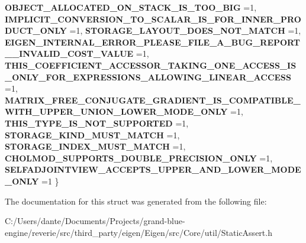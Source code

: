 \begin{DoxyCompactItemize}
\newline
{\bfseries O\+B\+J\+E\+C\+T\+\_\+\+A\+L\+L\+O\+C\+A\+T\+E\+D\+\_\+\+O\+N\+\_\+\+S\+T\+A\+C\+K\+\_\+\+I\+S\+\_\+\+T\+O\+O\+\_\+\+B\+IG} =1, 
{\bfseries I\+M\+P\+L\+I\+C\+I\+T\+\_\+\+C\+O\+N\+V\+E\+R\+S\+I\+O\+N\+\_\+\+T\+O\+\_\+\+S\+C\+A\+L\+A\+R\+\_\+\+I\+S\+\_\+\+F\+O\+R\+\_\+\+I\+N\+N\+E\+R\+\_\+\+P\+R\+O\+D\+U\+C\+T\+\_\+\+O\+N\+LY} =1, 
{\bfseries S\+T\+O\+R\+A\+G\+E\+\_\+\+L\+A\+Y\+O\+U\+T\+\_\+\+D\+O\+E\+S\+\_\+\+N\+O\+T\+\_\+\+M\+A\+T\+CH} =1, 
{\bfseries E\+I\+G\+E\+N\+\_\+\+I\+N\+T\+E\+R\+N\+A\+L\+\_\+\+E\+R\+R\+O\+R\+\_\+\+P\+L\+E\+A\+S\+E\+\_\+\+F\+I\+L\+E\+\_\+\+A\+\_\+\+B\+U\+G\+\_\+\+R\+E\+P\+O\+R\+T\+\_\+\+\_\+\+I\+N\+V\+A\+L\+I\+D\+\_\+\+C\+O\+S\+T\+\_\+\+V\+A\+L\+UE} =1, 
\newline
{\bfseries T\+H\+I\+S\+\_\+\+C\+O\+E\+F\+F\+I\+C\+I\+E\+N\+T\+\_\+\+A\+C\+C\+E\+S\+S\+O\+R\+\_\+\+T\+A\+K\+I\+N\+G\+\_\+\+O\+N\+E\+\_\+\+A\+C\+C\+E\+S\+S\+\_\+\+I\+S\+\_\+\+O\+N\+L\+Y\+\_\+\+F\+O\+R\+\_\+\+E\+X\+P\+R\+E\+S\+S\+I\+O\+N\+S\+\_\+\+A\+L\+L\+O\+W\+I\+N\+G\+\_\+\+L\+I\+N\+E\+A\+R\+\_\+\+A\+C\+C\+E\+SS} =1, 
{\bfseries M\+A\+T\+R\+I\+X\+\_\+\+F\+R\+E\+E\+\_\+\+C\+O\+N\+J\+U\+G\+A\+T\+E\+\_\+\+G\+R\+A\+D\+I\+E\+N\+T\+\_\+\+I\+S\+\_\+\+C\+O\+M\+P\+A\+T\+I\+B\+L\+E\+\_\+\+W\+I\+T\+H\+\_\+\+U\+P\+P\+E\+R\+\_\+\+U\+N\+I\+O\+N\+\_\+\+L\+O\+W\+E\+R\+\_\+\+M\+O\+D\+E\+\_\+\+O\+N\+LY} =1, 
{\bfseries T\+H\+I\+S\+\_\+\+T\+Y\+P\+E\+\_\+\+I\+S\+\_\+\+N\+O\+T\+\_\+\+S\+U\+P\+P\+O\+R\+T\+ED} =1, 
{\bfseries S\+T\+O\+R\+A\+G\+E\+\_\+\+K\+I\+N\+D\+\_\+\+M\+U\+S\+T\+\_\+\+M\+A\+T\+CH} =1, 
\newline
{\bfseries S\+T\+O\+R\+A\+G\+E\+\_\+\+I\+N\+D\+E\+X\+\_\+\+M\+U\+S\+T\+\_\+\+M\+A\+T\+CH} =1, 
{\bfseries C\+H\+O\+L\+M\+O\+D\+\_\+\+S\+U\+P\+P\+O\+R\+T\+S\+\_\+\+D\+O\+U\+B\+L\+E\+\_\+\+P\+R\+E\+C\+I\+S\+I\+O\+N\+\_\+\+O\+N\+LY} =1, 
{\bfseries S\+E\+L\+F\+A\+D\+J\+O\+I\+N\+T\+V\+I\+E\+W\+\_\+\+A\+C\+C\+E\+P\+T\+S\+\_\+\+U\+P\+P\+E\+R\+\_\+\+A\+N\+D\+\_\+\+L\+O\+W\+E\+R\+\_\+\+M\+O\+D\+E\+\_\+\+O\+N\+LY} =1
 \}
\end{DoxyCompactItemize}


The documentation for this struct was generated from the following file\+:\begin{DoxyCompactItemize}
\item 
C\+:/\+Users/dante/\+Documents/\+Projects/grand-\/blue-\/engine/reverie/src/third\+\_\+party/eigen/\+Eigen/src/\+Core/util/Static\+Assert.\+h\end{DoxyCompactItemize}
